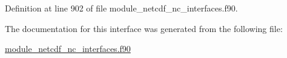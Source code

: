 Definition at line 902 of file module\+\_\+netcdf\+\_\+nc\+\_\+interfaces.\+f90.



The documentation for this interface was generated from the following file\+:\begin{DoxyCompactItemize}
\item 
\hyperlink{module__netcdf__nc__interfaces_8f90}{module\+\_\+netcdf\+\_\+nc\+\_\+interfaces.\+f90}\end{DoxyCompactItemize}
